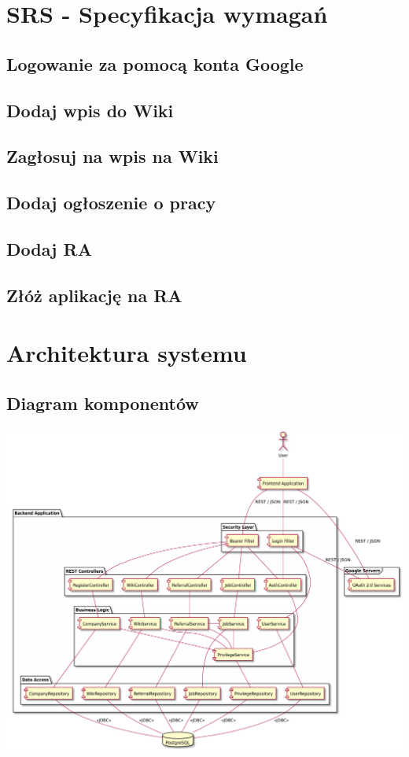 \documentclass{scrreprt}
\begin{document}
\chapter{SRS - Specyfikacja wymagań}
\section{Logowanie za pomocą konta Google}
\section{Dodaj wpis do Wiki}
\section{Zagłosuj na wpis na Wiki}
\section{Dodaj ogłoszenie o pracy}
\section{Dodaj RA}
\section{Złóż aplikację na RA}


\chapter{Architektura systemu}

\section{Diagram komponentów}
\includegraphics[width=\textwidth, keepaspectratio]{hydra_component_diagram.pdf}
\end{document}

